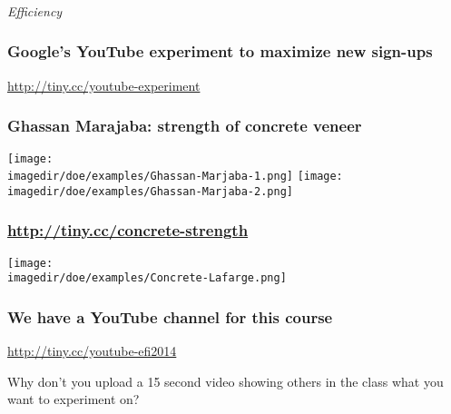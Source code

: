 %

\begin{frame}[plain]\frametitle{}
	\begin{center}
		\Huge{\emph{Efficiency}}
	\end{center}	
\end{frame}

\begin{frame}\frametitle{Google's YouTube experiment to maximize new sign-ups}
	\begin{center}
		\Huge{\href{http://tiny.cc/youtube-experiment}{http://tiny.cc/youtube-experiment}}
	\end{center}	
\end{frame}

\begin{frame}\frametitle{Ghassan Marajaba: strength of concrete veneer}
	\begin{center}
		\texttt{[image: \\imagedir/doe/examples/Ghassan-Marjaba-1.png]}
		\texttt{[image: \\imagedir/doe/examples/Ghassan-Marjaba-2.png]}
	\end{center}
\end{frame}

\begin{frame}\frametitle{\href{http://tiny.cc/concrete-strength}{http://tiny.cc/concrete-strength}}
	\begin{center}
		\texttt{[image: \\imagedir/doe/examples/Concrete-Lafarge.png]}
	\end{center}
\end{frame}

\begin{frame}\frametitle{We have a YouTube channel for this course}
	{\Huge \href{http://tiny.cc/youtube-efi2014}{http://tiny.cc/youtube-efi2014}
	
	\vspace{24pt}	
	Why don't you upload a 15 second video showing others in the class what you want to experiment on?	
	}
\end{frame}

